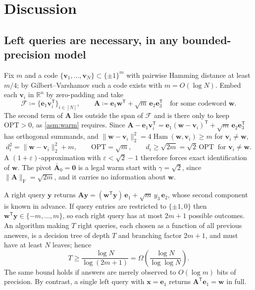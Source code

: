 \documentclass{article}
\renewcommand{\vec}[1]{\mathbf{#1}}          %
\newcommand{\T}{\mathsf{T}}                  %
\newcommand{\F}{\mathrm{F}}                  %
\newcommand{\eps}{\varepsilon}
\newcommand{\cF}{\mathcal{F}}
\newcommand{\OPT}{\mathrm{OPT}}
\theoremstyle{remark}
\begin{document}
\section{Discussion}\label{sec:discussion}

\subsection{Left queries are necessary, in any bounded-precision model}\label{sec:onesided}

Fix $m$ and a code $\{\vec{v}_1, \dots, \vec{v}_N\} \subset \{\pm 1\}^m$ with pairwise Hamming distance at least $m/4$; by Gilbert--Varshamov such a code exists with $m = O(\log N)$.
Embed each $\vec{v}_i$ in $\mathbb{R}^n$ by zero-padding and take
\[
\cF \coloneqq \{\vec{e}_1\vec{v}_i^\T\}_{i \in [N]},
\qquad
\vec{A} \coloneqq \vec{e}_1\vec{w}^\T + \sqrt{m}\,\vec{e}_2\vec{e}_3^\T
\quad\text{for some codeword } \vec{w} .
\]
The second term of $\vec{A}$ lies outside the span of $\cF$ and is there only to keep $\OPT > 0$, as \cref{asm:warm} requires.
Since $\vec{A} - \vec{e}_1\vec{v}_i^\T = \vec{e}_1(\vec{w} - \vec{v}_i)^\T + \sqrt{m}\,\vec{e}_2\vec{e}_3^\T$ has orthogonal summands, and $\|\vec{w} - \vec{v}_i\|_2^2 = 4\operatorname{Ham}(\vec{w}, \vec{v}_i) \ge m$ for $\vec{v}_i \ne \vec{w}$,
\[
d_i^2 = \|\vec{w} - \vec{v}_i\|_2^2 + m,
\qquad
\OPT = \sqrt{m},
\qquad
d_i \ge \sqrt{2m} = \sqrt{2}\,\OPT \ \text{ for } \vec{v}_i \ne \vec{w}.
\]
A $(1+\eps)$-approximation with $\eps < \sqrt2 - 1$ therefore forces exact identification of $\vec{w}$.
The pivot $\bar{\vec{A}}_0 = \vec{0}$ is a legal warm start with $\gamma = \sqrt{2}$, since $\|\vec{A}\|_\F = \sqrt{2m}$, and it carries no information about $\vec{w}$.

A right query $\vec{y}$ returns $\vec{A}\vec{y} = (\vec{w}^\T\vec{y})\,\vec{e}_1 + \sqrt{m}\,y_3\,\vec{e}_2$, whose second component is known in advance.
If query entries are restricted to $\{\pm1, 0\}$ then $\vec{w}^\T\vec{y} \in \{-m, \dots, m\}$, so each right query has at most $2m+1$ possible outcomes.
An algorithm making $T$ right queries, each chosen as a function of all previous answers, is a decision tree of depth $T$ and branching factor $2m+1$, and must have at least $N$ leaves; hence
\[
T \ge \frac{\log N}{\log(2m+1)} = \Omega\!\left( \frac{\log N}{\log\log N} \right).
\]
The same bound holds if answers are merely observed to $O(\log m)$ bits of precision.
By contrast, a single left query with $\vec{x} = \vec{e}_1$ returns $\vec{A}^\T\vec{e}_1 = \vec{w}$ in full.
\end{document}
